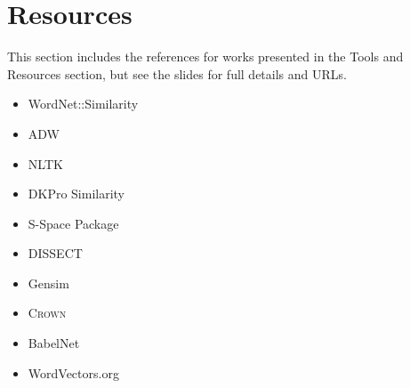 \documentclass[fullname]{clv2}
\begin{document}
\section{Resources}

This section includes the references for works presented in the Tools and Resources section, but see the slides for full details and URLs.

\begin{itemize}
\item WordNet::Similarity \cite{pedersen2004wordnet}
\item ADW \cite{pilehvar2015open}
\item NLTK \cite{bird2006nltk}
\item DKPro Similarity \cite{bar2013dkpro}
\item S-Space Package \cite{jurgens2010s}
\item DISSECT \cite{dinu2013dissect}
\item Gensim \cite{rehurek_lrec}
\item \textsc{Crown} \cite{jurgens2015reserating}
\item BabelNet \cite{navigli2012babelnet}
\item WordVectors.org \cite{faruqui-2014:SystemDemo}

\end{itemize}



\end{document}
